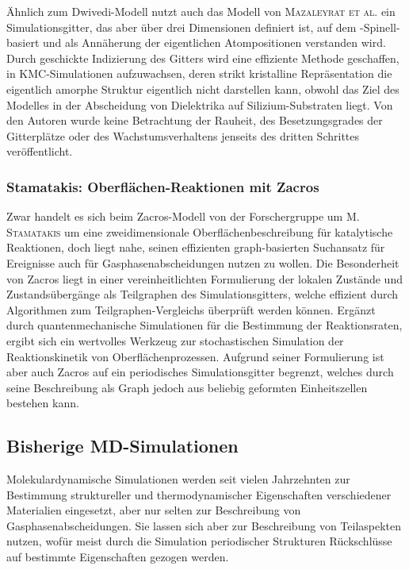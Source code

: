 Ähnlich zum Dwivedi-Modell nutzt auch das Modell von \textsc{Mazaleyrat et al.}\cite{mazaleyrat_methodology_2005} ein Simulationsgitter, das aber über drei Dimensionen definiert ist, auf dem -Spinell-basiert und als Annäherung der eigentlichen Atompositionen verstanden wird.
Durch geschickte Indizierung des Gitters wird eine effiziente Methode geschaffen,  in KMC-Simulationen aufzuwachsen, deren strikt kristalline Repräsentation die eigentlich amorphe Struktur eigentlich nicht darstellen kann, obwohl das Ziel des Modelles in der Abscheidung von Dielektrika auf Silizium-Substraten liegt.
Von den Autoren wurde keine Betrachtung der Rauheit, des Besetzungsgrades der Gitterplätze oder des Wachstumsverhaltens jenseits des dritten Schrittes veröffentlicht.

\subsubsection{Stamatakis: Oberflächen-Reaktionen mit Zacros}

Zwar handelt es sich beim Zacros-Modell von der Forschergruppe um \textsc{M. Stamatakis}\cite{stamatakis_graph-theoretical_2011,nielsen_parallel_2013,stamatakis_zacros_2014} um eine zweidimensionale Oberflächenbeschreibung für katalytische Reaktionen, doch liegt nahe, seinen effizienten graph-basierten Suchansatz für Ereignisse auch für Gasphasenabscheidungen nutzen zu wollen.
Die Besonderheit von Zacros liegt in einer vereinheitlichten Formulierung der lokalen Zustände und Zustandsübergänge als Teilgraphen des Simulationsgitters, welche effizient durch Algorithmen zum Teilgraphen-Vergleichs überprüft werden können.
Ergänzt durch quantenmechanische Simulationen für die Bestimmung der Reaktionsraten, ergibt sich ein wertvolles Werkzeug zur stochastischen Simulation der Reaktionskinetik von Oberflächenprozessen.
Aufgrund seiner Formulierung ist aber auch Zacros auf ein periodisches Simulationsgitter begrenzt, welches durch seine Beschreibung als Graph jedoch aus beliebig geformten Einheitszellen bestehen kann.

\subsection{Bisherige MD-Simulationen}

Molekulardynamische Simulationen werden seit vielen Jahrzehnten zur Bestimmung struktureller und thermodynamischer Eigenschaften verschiedener Materialien eingesetzt, aber nur selten zur Beschreibung von Gasphasenabscheidungen.
Sie lassen sich aber zur Beschreibung von Teilaspekten nutzen, wofür meist durch die Simulation periodischer Strukturen Rückschlüsse auf bestimmte Eigenschaften gezogen werden.

